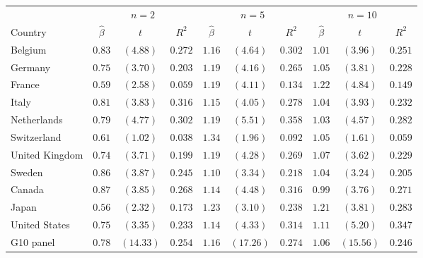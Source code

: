 \footnotesize
\setlength{\tabcolsep}{4pt}
\begin{tabular}{l ccc ccc ccc}
  \toprule
  & \multicolumn{3}{c}{$n=2$} & \multicolumn{3}{c}{$n=5$} & \multicolumn{3}{c}{$n=10$} \\
  \cmidrule(lr){2-4}\cmidrule(lr){5-7}\cmidrule(lr){8-10}
  Country & $\hat{\beta}$ & $t$ & $R^{2}$ & $\hat{\beta}$ & $t$ & $R^{2}$ & $\hat{\beta}$ & $t$ & $R^{2}$ \\
  \midrule
  Belgium     & $0.83$ & $(4.88)$ & $0.272$ & $1.16$ & $(4.64)$ & $0.302$ & $1.01$ & $(3.96)$ & $0.251$ \\
  Germany     & $0.75$ & $(3.70)$ & $0.203$ & $1.19$ & $(4.16)$ & $0.265$ & $1.05$ & $(3.81)$ & $0.228$ \\
  France      & $0.59$ & $(2.58)$ & $0.059$ & $1.19$ & $(4.11)$ & $0.134$ & $1.22$ & $(4.84)$ & $0.149$ \\
  Italy       & $0.81$ & $(3.83)$ & $0.316$ & $1.15$ & $(4.05)$ & $0.278$ & $1.04$ & $(3.93)$ & $0.232$ \\
  Netherlands & $0.79$ & $(4.77)$ & $0.302$ & $1.19$ & $(5.51)$ & $0.358$ & $1.03$ & $(4.57)$ & $0.282$ \\
  Switzerland & $0.61$ & $(1.02)$ & $0.038$ & $1.34$ & $(1.96)$ & $0.092$ & $1.05$ & $(1.61)$ & $0.059$ \\
  United Kingdom & $0.74$ & $(3.71)$ & $0.199$ & $1.19$ & $(4.28)$ & $0.269$ & $1.07$ & $(3.62)$ & $0.229$ \\
  Sweden      & $0.86$ & $(3.87)$ & $0.245$ & $1.10$ & $(3.34)$ & $0.218$ & $1.04$ & $(3.24)$ & $0.205$ \\
  Canada      & $0.87$ & $(3.85)$ & $0.268$ & $1.14$ & $(4.48)$ & $0.316$ & $0.99$ & $(3.76)$ & $0.271$ \\
  Japan       & $0.56$ & $(2.32)$ & $0.173$ & $1.23$ & $(3.10)$ & $0.238$ & $1.21$ & $(3.81)$ & $0.283$ \\
  United States & $0.75$ & $(3.35)$ & $0.233$ & $1.14$ & $(4.33)$ & $0.314$ & $1.11$ & $(5.20)$ & $0.347$ \\
  \midrule
  G10 panel   & $0.78$ & $(14.33)$ & $0.254$ & $1.16$ & $(17.26)$ & $0.274$ & $1.06$ & $(15.56)$ & $0.246$ \\
  \bottomrule
\end{tabular}
